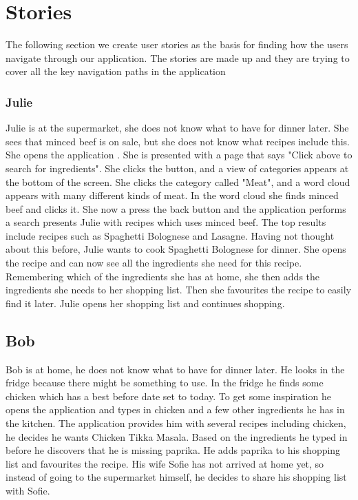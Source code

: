 \section{Stories}
The following section we create user stories as the basis for finding how the users navigate through our application. The stories are made up and they are trying to cover all the key navigation paths in the application

\subsubsection*{Julie}

Julie is at the supermarket, she does not know what to have for dinner later. She sees that minced beef is on sale, but she does not know what recipes include this. She opens the application \appname. She is presented with a page that says "Click above to search for ingredients". She clicks the button, and a view of categories appears at the bottom of the screen. She clicks the category called "Meat", and a word cloud appears with many different kinds of meat. In the word cloud she finds minced beef and clicks it. She now a press the back button and the application performs a search presents Julie with recipes which uses minced beef. The top results include recipes such as Spaghetti Bolognese and Lasagne. Having not thought about this before, Julie wants to cook Spaghetti Bolognese for dinner. She opens the recipe and can now see all the ingredients she need for this recipe. Remembering which of the ingredients she has at home, she then adds the ingredients she needs to her shopping list. Then she favourites the recipe to easily find it later. Julie opens her shopping list and continues shopping.

\subsection*{Bob}
Bob is at home, he does not know what to have for dinner later. He looks in the fridge because there might be something to use. In the fridge he finds some chicken which has a best before date set to today. To get some inspiration he opens the application and types in chicken and a few other ingredients he has in the kitchen. The application provides him with several recipes including chicken, he decides he wants Chicken Tikka Masala. Based on the ingredients he typed in before he discovers that he is missing paprika. He adds paprika to his shopping list and favourites the recipe. His wife Sofie has not arrived at home yet, so instead of going to the supermarket himself, he decides to share his shopping list with Sofie.

